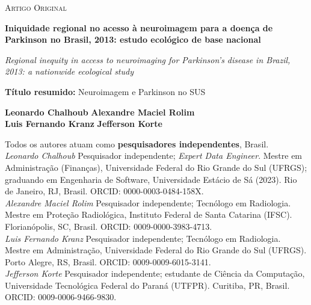 \documentclass[12pt,a4paper,oneside]{article}
\begin{document}
\thispagestyle{fancy}
\begin{singlespace}

\begin{center}
{\small\textsc{Artigo Original}}

\vspace{10pt}
{\large\bfseries Iniquidade regional no acesso à neuroimagem para a
doença de Parkinson no Brasil, 2013: estudo ecológico
de base nacional\par}

\vspace{8pt}
{\itshape Regional inequity in access to neuroimaging for Parkinson's
disease in Brazil, 2013: a nationwide ecological
study\par}

\vspace{8pt}
{\footnotesize\textbf{Título resumido:} Neuroimagem e Parkinson no SUS}

\vspace{14pt}
\textbf{Leonardo Chalhoub} \quad\textbullet\quad \textbf{Alexandre Maciel Rolim}\\[4pt]
\textbf{Luis Fernando Kranz} \quad\textbullet\quad \textbf{Jefferson Korte}
\end{center}

\vspace{0.4cm}
\small
\noindent Todos os autores atuam como \textbf{pesquisadores
independentes}, Brasil.\\[4pt]
\noindent\textit{Leonardo Chalhoub} \textemdash{} Pesquisador
independente; \textit{Expert Data Engineer}. Mestre em Administração
(Finanças), Universidade Federal do Rio Grande do Sul (UFRGS);
graduando em Engenharia de Software, Universidade Estácio de Sá
(2023). Rio de Janeiro, RJ, Brasil.
ORCID: 0000-0003-0484-158X.\\[2pt]
\noindent\textit{Alexandre Maciel Rolim} \textemdash{} Pesquisador
independente; Tecnólogo em Radiologia. Mestre em Proteção Radiológica,
Instituto Federal de Santa Catarina (IFSC). Florianópolis, SC, Brasil.
ORCID: 0009-0000-3983-4713.\\[2pt]
\noindent\textit{Luis Fernando Kranz} \textemdash{} Pesquisador
independente; Tecnólogo em Radiologia. Mestre em Administração,
Universidade Federal do Rio Grande do Sul (UFRGS). Porto Alegre, RS,
Brasil. ORCID: 0009-0009-6015-3141.\\[2pt]
\noindent\textit{Jefferson Korte} \textemdash{} Pesquisador
independente; estudante de Ciência da Computação, Universidade
Tecnológica Federal do Paraná (UTFPR). Curitiba, PR, Brasil.
ORCID: 0009-0006-9466-9830.


\end{singlespace}
\end{document}
